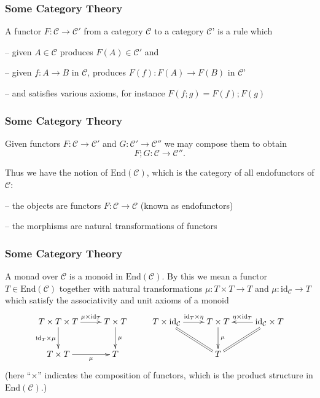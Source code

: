 \documentclass[xcolor=pdftex,dvipsnames,table]{beamer}
\newcommand{\C}{\ensuremath{\mathcal{C}}}
\newcommand{\id}{\ensuremath{\mathrm{id}}}
\newcommand{\idc}{\ensuremath{\mathrm{id}_\mathcal{C}}}
\newcommand{\End}{\ensuremath{\mathrm{End}}}
\begin{document}
\begin{frame}
    \frametitle{Some Category Theory}
    \begin{definition}
        A functor $F : \C \rightarrow \C'$ from a category \C{} to a
        category \C' is a rule which

        -- given $A\in \C$ produces $F(A) \in \C'$ and

        -- given $f: A \rightarrow B$ in \C, produces $F(f):F(A)
        \rightarrow F(B)$ in \C'

        -- and satisfies various axioms, for instance $F(f;g) = F(f);F(g)$
    \end{definition}
\end{frame}

\begin{frame}
    \frametitle{Some Category Theory}
    \begin{definition}
        Given functors $F : \C \rightarrow \C'$ and $G: \C'\rightarrow
        \C''$ we may compose them to obtain $$F;G : \C \rightarrow
        \C''.$$

        Thus we have the notion of $\End(\C)$, which is the
        category of all endofunctors of \C{}:

        -- the objects are functors $F : \C \rightarrow \C$ (known as
        endofunctors)

        -- the morphisms are natural transformations of functors
    \end{definition}
\end{frame}

\begin{frame}
    \frametitle{Some Category Theory}
    \begin{definition}
        A monad over \C{} is a monoid in $\End(\C)$. By this we mean a
        functor $T \in \End(\C)$ together with natural transformations
        $\mu : T\times T \rightarrow T$ and $\mu : \idc \rightarrow T$
        which satisfy the associativity and unit axioms of a monoid
        {\scriptsize
\begin{equation*}
\xymatrix{
T\times T \times T \ar[d]_{\id_T \times \mu} \ar[r]^-{\mu\times \id_T} & T\times T \ar[d]^{\mu}
 & T\times \idc \ar[r]^-{\id_T\times \eta} \ar@{=}[dr] & T\times T \ar[d]^-{\mu} & \idc \times T \ar[l]_-{\eta \times \id_T}\ar@{=}[ld] \\
T\times T \ar[r]_-{\mu} & T
 & & T }
\end{equation*} }
(here ``$\times$'' indicates the composition of functors, which is the
product structure in $\End(\C)$.)
    \end{definition}
\end{frame}
\end{document}
